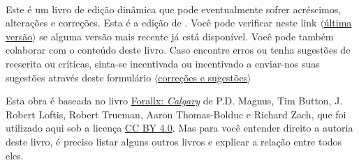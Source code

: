 \newpage

\thispagestyle{empty}
\onecolumn
\ 
\vfill

\parbox{3 in}{

Este é um livro de edição dinâmica que pode eventualmente sofrer acréscimos, alterações e correções.
Esta é a edição de \mydate.
Você pode verificar neste link
\href{https://github.com/Grupo-de-Estudos-em-Logica-da-UFRN/Para-Todxs-Natal/blob/main/paratodxsnatal.pdf}{$\langle$última versão$\rangle$}
se alguma versão mais recente já está disponível.
Você pode também colaborar com o conteúdo deste livro.
Caso encontre erros ou tenha sugestões de reescrita ou críticas, sinta-se incentivada ou incentivado a enviar-nos suas sugestões através deste formulário
\href{https://forms.gle/yd4yH9WAo6TxAiSj8}{$\langle$correções e sugestões$\rangle$}

}

\newpage

\noindent Esta obra é baseada no livro \href{https://github.com/rzach/forallx-yyc}{Forallx: \textit{Calgary}} de P.D. Magnus, Tim Button, J. Robert Loftis, Robert Trueman, Aaron Thomas-Bolduc e Richard Zach, que foi utilizado aqui sob a licença \href{https://creativecommons.org/licenses/by/4.0/}{CC BY 4.0}.
Mas para você entender direito a autoria deste livro, é preciso listar alguns outros livros e explicar a relação entre todos eles.

